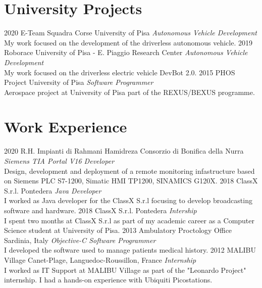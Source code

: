 \documentclass[]{friggeri-cv}
\begin{document}
\section{University Projects}
\vspace{-3mm}
\begin{entrylist}
\entry
{2020}
{E-Team Squadra Corse}
{University of Pisa}
{\emph{Autonomous Vehicle Development}\\
My work focused on the development of the driverless autonomous vehicle.}
\entry
{2019}
{Roborace}
{University of Pisa - E. Piaggio Research Center}
{\emph{Autonomous Vehicle Development}\\
My work focused on the driverless electric vehicle DevBot 2.0.}
\entry
{2015}
{PHOS Project}
{University of Pisa}
{\emph{Software Programmer}\\
Aerospace project at University of Pisa part of the REXUS/BEXUS programme.}
\end{entrylist}

\patchcmd{\entry}{14.8cm}{11.8cm}{}{}
\section{Work Experience}
\vspace{-3mm}
\begin{entrylist}
\entry
{2020}
{R.H. Impianti di Rahmani Hamidreza}
{Consorzio di Bonifica della Nurra}
{\emph{Siemens TIA Portal V16 Developer}\\
Design, development and deployment of a remote monitoring infastructure based
on Siemens PLC S7-1200, Simatic HMI TP1200, SINAMICS G120X.}
\entry
{2018}
{ClassX S.r.l.}
{Pontedera}
{\emph{Java Developer} \\
I worked as Java developer for the ClassX S.r.l focusing to develop broadcasting software and hardware.}
\entry
{2018}
{ClassX S.r.l.}
{Pontedera}
{\emph{Intership} \\
I spent two months at ClassX S.r.l as part of my academic career as a Computer Science student at University of Pisa.}
\entry
{2013}
{Ambulatory Proctology Office}
{Sardinia, Italy}
{\emph{Objective-C Software Programmer} \\
I developed the software used to manage patients medical history.}
\entry
{2012}
{MALIBU Village}
{Canet-Plage, Languedoc-Roussillon, France}
{\emph{Internship} \\
I worked as IT Support at MALIBU Village as part of the "Leonardo Project" internship. I had a hands-on experience with Ubiquiti Picostations.}
\end{entrylist}
\clearpage
\end{document}
